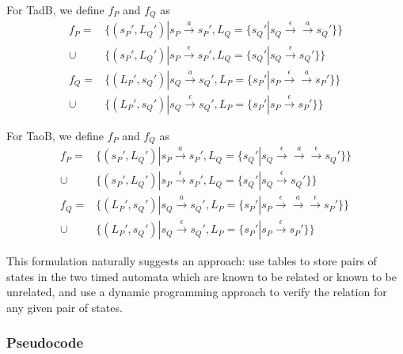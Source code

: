 \documentclass[a4paper]{llncs}
\begin{document}
For TadB, we define $f_P$ and $f_Q$ as
\begin{align*}
  f_P = & \{(s_P', L_Q') | s_P \xrightarrow{a} s_P', 
  L_Q=\{ s_Q' | s_Q \xrightarrow{\epsilon}\xrightarrow{a} s_Q'\}\} \\
  \cup & \{(s_P', L_Q') | s_P \xrightarrow{\epsilon} s_P', 
  L_Q=\{ s_Q' | s_Q \xrightarrow{\epsilon} s_Q'\}\} \\
  f_Q = & \{(L_P', s_Q') | s_Q \xrightarrow{a} s_Q', 
  L_P=\{ s_P' | s_P \xrightarrow{\epsilon}\xrightarrow{a} s_P'\}\} \\
  \cup & \{(L_P', s_Q') | s_Q \xrightarrow{\epsilon} s_Q', 
  L_P=\{ s_P' | s_P \xrightarrow{\epsilon} s_P'\}\} 
\end{align*}

For TaoB, we define $f_P$ and $f_Q$ as
\begin{align*}
  f_P = & \{(s_P', L_Q') | s_P \xrightarrow{a} s_P', 
  L_Q=\{ s_Q' | s_Q \xrightarrow{\epsilon}\xrightarrow{a}\xrightarrow{\epsilon} s_Q'\}\} \\
  \cup & \{(s_P', L_Q') | s_P \xrightarrow{\epsilon} s_P', 
  L_Q=\{ s_Q' | s_Q \xrightarrow{\epsilon} s_Q'\}\} \\
  f_Q = & \{(L_P', s_Q') | s_Q \xrightarrow{a} s_Q', 
  L_P=\{ s_P' | s_P \xrightarrow{\epsilon}\xrightarrow{a}\xrightarrow{\epsilon} s_P'\}\} \\
  \cup & \{(L_P', s_Q') | s_Q \xrightarrow{\epsilon} s_Q', 
  L_P=\{ s_P' | s_P \xrightarrow{\epsilon} s_P'\}\} 
\end{align*}

This formulation naturally suggests an approach: use tables to store
pairs of states in the two timed automata which are known to be
related or known to be unrelated, and use a dynamic programming
approach to verify the relation for any given pair of states.

\subsubsection{Pseudocode}
\end{document}
